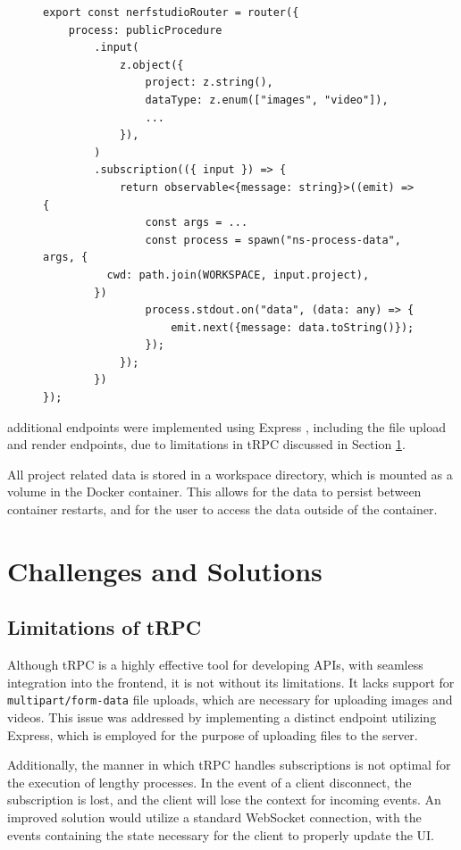 \begin{figure}[htb]
\begin{lstlisting}[style=ES6, caption=Example tRPC endpoint for Pre-Processing returning a subscription., label=lst:trpc]
export const nerfstudioRouter = router({
	process: publicProcedure
		.input(
			z.object({
				project: z.string(),
				dataType: z.enum(["images", "video"]),
				...
			}),
		)
		.subscription(({ input }) => {
			return observable<{message: string}>((emit) => {
				const args = ...
				const process = spawn("ns-process-data", args, {
          cwd: path.join(WORKSPACE, input.project),
        })
				process.stdout.on("data", (data: any) => {
					emit.next({message: data.toString()});
				});
			});
		})
});
\end{lstlisting}
\end{figure}

additional endpoints were implemented using Express \cite{noauthor_express_nodate}, including the file upload and render endpoints, due to limitations in tRPC discussed in Section \ref{sec:system:challenges}.

All project related data is stored in a workspace directory, which is mounted as a volume in the Docker container.
This allows for the data to persist between container restarts, and for the user to access the data outside of the container.

\section{Challenges and Solutions}
\label{sec:system:challenges}

\subsection*{Limitations of tRPC}

Although tRPC is a highly effective tool for developing APIs, with seamless integration into the frontend, it is not without its limitations.
It lacks support for \texttt{multipart/form-data} file uploads, which are necessary for uploading images and videos.
This issue was addressed by implementing a distinct endpoint utilizing Express, which is employed for the purpose of uploading files to the server.

Additionally, the manner in which tRPC handles subscriptions is not optimal for the execution of lengthy processes.
In the event of a client disconnect, the subscription is lost, and the client will lose the context for incoming events.
An improved solution would utilize a standard WebSocket connection, with the events containing the state necessary for the client to properly update the UI.


